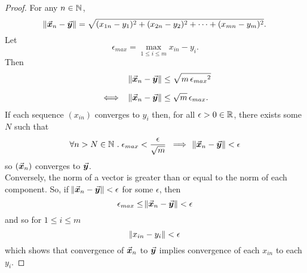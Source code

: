 \documentclass[../MathsNotesBase.tex]{subfiles}
\begin{document}
		\biggerskip
		\begin{proof}
			For any ${ n \in \mathbb{N}^{} }$,
			\[ \norm{\vec{\bm{x}}_n - \vec{\bm{y}}} = \sqrt{ (x_{1n} - y_1)^2 + (x_{2n} - y_2)^2 + \cdots + (x_{mn} - y_m)^2 }. \]
			Let
			\[ \epsilon_{max} = \max_{1 \leq i \leq m} x_{in} - y_i. \]
			Then
			\[\begin{aligned}
				&& \norm{\x_n - \y} &\leq \sqrt{m\, {\epsilon_{max}}^2} \nn
				&\iff & \norm{\x_n - \y} &\leq \sqrt{m}\, \epsilon_{max}.
			\end{aligned}\]
			If each sequence $(x_{in})$ converges to $y_i$ then, for all ${ \epsilon > 0 \in \mathbb{R}^{} }$, there exists some $N$ such that
			\[ \forall n > N \in \mathbb{N}^{} \;.\; \epsilon_{max} < \frac{\epsilon}{\sqrt{m}} \; \implies \; \norm{\vec{\bm{x}}_n - \vec{\bm{y}}} < \epsilon \]
			so $(\vec{\bm{x}}_n)$ converges to $\vec{\bm{y}}$.\\
			
			Conversely, the norm of a vector is greater than or equal to the norm of each component. So, if ${ \norm{\vec{\bm{x}}_n - \vec{\bm{y}}} < \epsilon }$ for some ${ \epsilon }$, then
			\[ \epsilon_{max} \leq \norm{\vec{\bm{x}}_n - \vec{\bm{y}}} < \epsilon \]
			and so for ${ 1 \leq i \leq m }$
			\[ \norm{x_{in} - y_i} < \epsilon \]
			which shows that convergence of $\vec{\bm{x}}_n$ to $\vec{\bm{y}}$ implies convergence of each $x_{in}$ to each $y_i$.
		\end{proof}


\pagebreak
\end{document}
